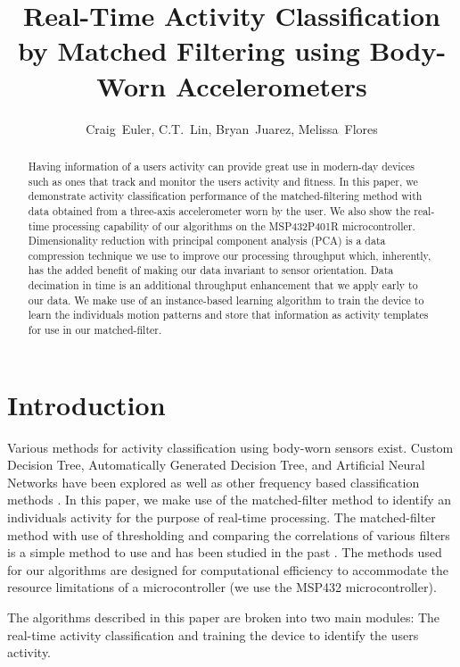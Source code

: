 \documentclass[journal]{IEEEtran}
\begin{document}
%
\title{Real-Time Activity Classification by Matched Filtering using Body-Worn Accelerometers}
%
\author{Craig~Euler, C.T.~Lin, Bryan~Juarez, Melissa~Flores}
%
\maketitle
%
\begin{abstract}
Having information of a user\textquotesingle s activity can provide great use in modern-day devices such as ones that track and monitor the user\textquotesingle s activity and fitness.
In this paper, we demonstrate activity classification performance of the matched-filtering method with data obtained from a three-axis accelerometer worn by the user.
We also show the real-time processing capability of our algorithms on the MSP432P401R microcontroller.
Dimensionality reduction with principal component analysis (PCA) \cite{bishop_2006} is a data compression technique we use to improve our processing throughput which, inherently, has the added benefit of making our data invariant to sensor orientation.
Data decimation in time is an additional throughput enhancement that we apply early to our data.
We make use of an instance-based learning algorithm to train the device to learn the individual\textquotesingle s motion patterns and store that information as activity templates for use in our matched-filter.
\end{abstract}
%
\section{Introduction}
Various methods for activity classification using body-worn sensors exist.
Custom Decision Tree, Automatically Generated Decision Tree, and Artificial Neural Networks \cite{parkka_ermes_korpipaa_mantyjarvi_peltola_korhonen_2006} have been explored as well as other frequency based classification methods \cite{sharma_purwar_lee_lee_chung_2008}.
In this paper, we make use of the matched-filter method to identify an individual\textquotesingle s activity for the purpose of real-time processing.
The matched-filter method with use of thresholding and comparing the correlations of various filters is a simple method to use and has been studied in the past \cite{giannakis_tsatsanis_1990}.
The methods used for our algorithms are designed for computational efficiency to accommodate the resource limitations of a microcontroller (we use the MSP432 microcontroller).

The algorithms described in this paper are broken into two main modules: The real-time activity classification and training the device to identify the user\textquotesingle s activity.
\end{document}
